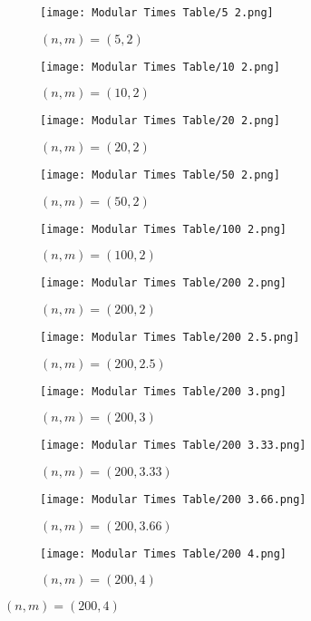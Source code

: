 \documentclass[../../Problems]{subfiles}
\begin{document}
\begin{figure}[H]
	\centering
	\begin{subfigure}{0.145\linewidth}
		\texttt{[image: Modular Times Table/5 2.png]}
		\caption{$(n,m) = (5,2)$}
	\end{subfigure}
	\begin{subfigure}{0.145\linewidth}
		\texttt{[image: Modular Times Table/10 2.png]}
		\caption{$(n,m) = (10,2)$}
	\end{subfigure}
	\begin{subfigure}{0.145\linewidth}
		\texttt{[image: Modular Times Table/20 2.png]}
		\caption{$(n,m) = (20,2)$}
	\end{subfigure}
	\begin{subfigure}{0.145\linewidth}
		\texttt{[image: Modular Times Table/50 2.png]}
		\caption{$(n,m) = (50,2)$}
	\end{subfigure}
	\begin{subfigure}{0.145\linewidth}
		\texttt{[image: Modular Times Table/100 2.png]}
		\caption{$(n,m) = (100,2)$}
	\end{subfigure}
	\begin{subfigure}{0.145\linewidth}
		\texttt{[image: Modular Times Table/200 2.png]}
		\caption{$(n,m) = (200,2)$}
	\end{subfigure}
		\begin{subfigure}{0.145\linewidth}
		\texttt{[image: Modular Times Table/200 2.5.png]}
		\caption{$(n,m) = (200,2.5)$}
	\end{subfigure}
	\begin{subfigure}{0.145\linewidth}
		\texttt{[image: Modular Times Table/200 3.png]}
		\caption{$(n,m) = (200,3)$}
	\end{subfigure}
	\begin{subfigure}{0.145\linewidth}
		\texttt{[image: Modular Times Table/200 3.33.png]}
		\caption{$(n,m) = (200,3.33)$}
	\end{subfigure}
	\begin{subfigure}{0.145\linewidth}
		\texttt{[image: Modular Times Table/200 3.66.png]}
		\caption{$(n,m) = (200,3.66)$}
	\end{subfigure}
	\begin{subfigure}{0.145\linewidth}
		\texttt{[image: Modular Times Table/200 4.png]}
		\caption{$(n,m) = (200,4)$}
	\end{subfigure}

\end{figure}
\end{document}
